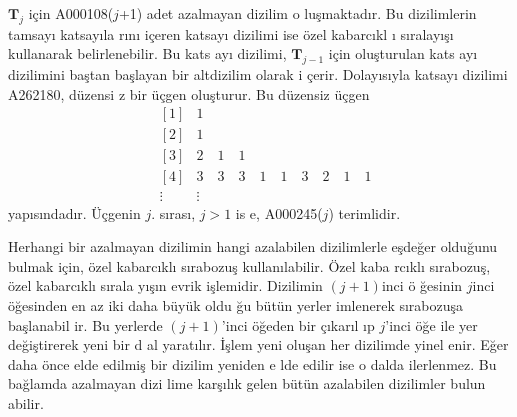 \documentclass[a4paper,10pt]{article}
\begin{document}
$\mathbf{T}_{j}$ i\c{c}in A000108($j$+1) adet azalmayan dizilim o%
lu\c{s}maktad\i r. Bu di\-zi\-lim\-le\-rin tamsay{\i} katsay\i la%
r\i n{\i} i\c{c}eren katsay{\i} dizilimi ise \"o\-zel kabarc\i kl%
{\i} s\i ralay\i \c{s}{\i} kul\-la\-narak belirlenebilir. Bu kats%
ay{\i} dizilimi, $\mathbf{T}_{j-1}$ i\c{c}in olu\c{s}turulan kats%
ay{\i} dizilimini ba\c{s}tan ba\c{s}layan bir altdizilim olarak i%
\c{c}erir. Dolay\i s\i yla katsay{\i} dizilimi A262180, d\"uzensi%
z bir \"u\c{c}gen olu\c{s}turur. Bu d\"uzensiz \"u\c{c}gen %
\begin{eqnarray}
&[1]& 1 \nonumber\\
&[2]& 1 \nonumber\\
&[3]& 2\quad 1\quad 1 \nonumber\\
&[4]& 3\quad 3\quad 3\quad 1\quad 1\quad 3\quad %
2\quad 1\quad 1 \nonumber\\
&\vdots&  \vdots
\end{eqnarray}
yap\i s\i ndad\i r. \"U\c{c}\-ge\-nin $j.$ s{\i}ras{\i}, $j>1$ is%
e, A000245($j$) terimlidir. %

Herhangi bir azalmayan dizilimin hangi azalabilen dizilim\-lerle %
e\c{s}\-de\-\u{ger} ol\-du\-\u{g}u\-nu bul\-mak i\c{c}in, \"ozel %
kabar\-c\i k\-l{\i} s\i rabozu\c{s} kullan\i labilir. \"Ozel kaba%
rc\i kl{\i} s\i rabozu\c{s}, \"ozel kabarc\i kl{\i} s{\i}\-ra\-la%
y{\i}\c{s}\i n evrik i\c{s}lemidir. Dizili\-min $(j+1)$in\-ci \"o%
\u{g}esinin $j$inci \"o\u{g}esinden en az iki daha b\"uy\"uk oldu%
\u{g}u b\"ut\"un yerler imlenerek s\i rabozu\c{s}a ba\c{s}lanabil%
ir. Bu yer\-ler\-de $(j+1)$'inci \"o\u{g}eden bir \c{c}\i kar\i l%
\i p $j$'inci \"o\u{g}e ile yer de\u{g}i\c{s}\-tirerek yeni bir d%
al yarat\i l\i r. \.I\c{s}lem yeni olu\c{s}an her dizilimde yinel%
enir. E\u{g}er daha \"once elde edilmi\c{s} bir dizilim yeniden e%
lde edilir ise o dalda ilerlenmez. Bu ba\u{g}lamda azalmayan dizi%
lime kar\c{s}\i l\i k gelen b\"ut\"un azalabilen dizilimler bulun%
abilir. %
\end{document}

